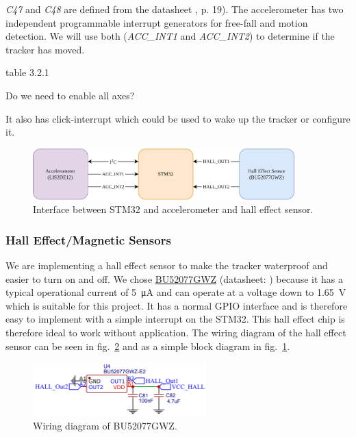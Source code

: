 \textit{C47} and \textit{C48} are defined from the datasheet , p. 19). The accelerometer has two independent programmable interrupt generators for free-fall and motion detection. We will use both (\textit{ACC\_INT1} and \textit{ACC\_INT2}) to determine if the tracker has moved.

table 3.2.1 

Do we need to enable all axes?

It also has click-interrupt which could be used to wake up the tracker or configure it.

\begin{figure}[H]
    \centering
    \includegraphics[width=0.9\textwidth]{figures/schematic_flow.png}
    \caption{Interface between STM32 and accelerometer and hall effect sensor.}
    \label{fig:schematic:accelerometer_halleffectsensor}
\end{figure}

\subsubsection{Hall Effect/Magnetic Sensors}
We are implementing a hall effect sensor to make the tracker waterproof and easier to turn on and off. We chose \hyperref[bom:bu52077gwz]{BU52077GWZ} (datasheet: ) because it has a typical operational current of \SI{5}{\micro\ampere} and can operate at a voltage down to \SI{1.65}{\volt} which is suitable for this project. It has a normal \ac{GPIO} interface and is therefore easy to implement with a simple interrupt on the STM32. This hall effect chip is therefore ideal to work without application. The wiring diagram of the hall effect sensor can be seen in fig.~\ref{fig:schematic:BU52077GWZ} and as a simple block diagram in fig.~\ref{fig:schematic:accelerometer_halleffectsensor}.

\begin{figure}[H]
  \centering
  \includegraphics[width=0.6\textwidth]{figures/Hall.PNG}
  \caption{Wiring diagram of BU52077GWZ.}
  \label{fig:schematic:BU52077GWZ}
\end{figure}


